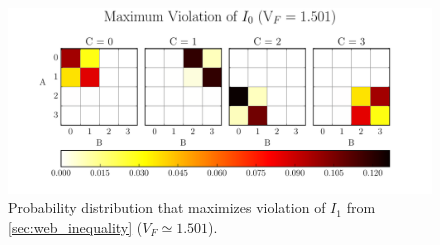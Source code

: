 \documentclass[aps, 10pt, english, twoside, pra, nofootinbib, tightenlines, longbibliography]{revtex4-1}
\begin{document}
    \begin{figure}
    \begin{center}
            \includegraphics[scale=0.6,trim={0 0 0 0.4in},clip]{../../figures/distributions/plotted_dist_I_1_max_violation_2017.pdf}
            \caption{Probability distribution that maximizes violation of $I_1$ from \cref{sec:web_inequality} ($V_F \simeq 1.501$).}
            \label{fig:maximum_violation_I_1}
    \end{center}
    \end{figure}
\end{document}
